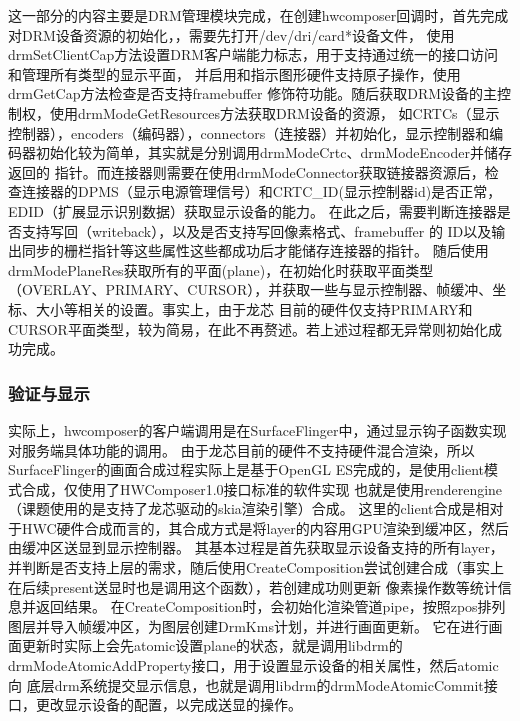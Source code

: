 这一部分的内容主要是DRM管理模块完成，在创建hwcomposer回调时，首先完成对DRM设备资源的初始化，，需要先打开/dev/dri/card*设备文件，
使用drmSetClientCap方法设置DRM客户端能力标志，用于支持通过统一的接口访问和管理所有类型的显示平面，
并启用和指示图形硬件支持原子操作，使用drmGetCap方法检查是否支持framebuffer 修饰符功能。随后获取DRM设备的主控制权，使用drmModeGetResources方法获取DRM设备的资源，
如CRTCs（显示控制器），encoders（编码器），connectors（连接器）并初始化，显示控制器和编码器初始化较为简单，其实就是分别调用drmModeCrtc、drmModeEncoder并储存返回的
指针。而连接器则需要在使用drmModeConnector获取链接器资源后，检查连接器的DPMS（显示电源管理信号）和CRTC\_ID(显示控制器id)是否正常，EDID（扩展显示识别数据）获取显示设备的能力。
在此之后，需要判断连接器是否支持写回（writeback），以及是否支持写回像素格式、framebuffer 的 ID以及输出同步的栅栏指针等这些属性这些都成功后才能储存连接器的指针。
随后使用drmModePlaneRes获取所有的平面(plane)，在初始化时获取平面类型（OVERLAY、PRIMARY、CURSOR），并获取一些与显示控制器、帧缓冲、坐标、大小等相关的设置。事实上，由于龙芯
目前的硬件仅支持PRIMARY和CURSOR平面类型，较为简易，在此不再赘述。若上述过程都无异常则初始化成功完成。

\subsubsection{验证与显示}

实际上，hwcomposer的客户端调用是在SurfaceFlinger中，通过显示钩子函数实现对服务端具体功能的调用。
由于龙芯目前的硬件不支持硬件混合渲染，所以SurfaceFlinger的画面合成过程实际上是基于OpenGL ES完成的，是使用client模式合成，仅使用了HWComposer1.0接口标准的软件实现
也就是使用renderengine（课题使用的是支持了龙芯驱动的skia渲染引擎）合成。
这里的client合成是相对于HWC硬件合成而言的，其合成方式是将layer的内容用GPU渲染到缓冲区，然后由缓冲区送显到显示控制器。
其基本过程是首先获取显示设备支持的所有layer，并判断是否支持上层的需求，随后使用CreateComposition尝试创建合成（事实上在后续present送显时也是调用这个函数），若创建成功则更新
像素操作数等统计信息并返回结果。
在CreateComposition时，会初始化渲染管道pipe，按照zpos排列图层并导入帧缓冲区，为图层创建DrmKms计划，并进行画面更新。
它在进行画面更新时实际上会先atomic设置plane的状态，就是调用libdrm的drmModeAtomicAddProperty接口，用于设置显示设备的相关属性，然后atomic向
底层drm系统提交显示信息，也就是调用libdrm的drmModeAtomicCommit接口，更改显示设备的配置，以完成送显的操作。


